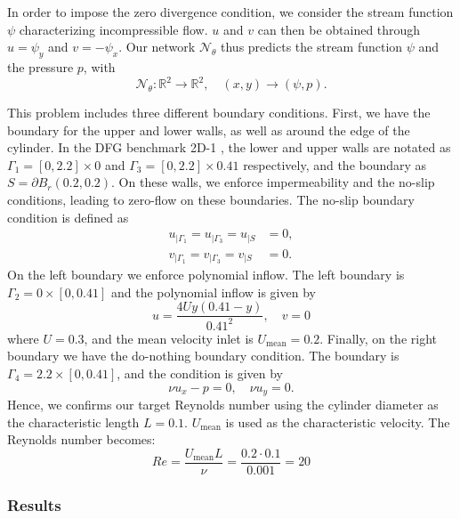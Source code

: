 In order to impose the zero divergence condition, we consider the stream function $\psi$ characterizing incompressible flow. $u$ and $v$ can then be obtained through $u=\psi_y$ and $v=-\psi_x$. Our network $\mathcal{N}_\theta$ thus predicts the stream function $\psi$ and the pressure $p$, with
\begin{equation}
    \mathcal{N}_\theta : \mathbb{R}^2 \to \mathbb{R}^2, \quad (x,y)\to (\psi, p).
\end{equation}


This problem includes three different boundary conditions.
First, we have the boundary for the upper and lower walls, as well as around the edge of the cylinder.
In the DFG benchmark 2D-1 \cite{DFG}, the lower and upper walls are notated as $\Gamma_1 = [0,2.2]\times 0$ and $\Gamma_3 = [0,2.2]\times 0.41$ respectively, and the boundary as $S=\partial B_r(0.2,0.2)$.
On these walls, we enforce impermeability and the no-slip conditions, leading to zero-flow on these boundaries. 
The no-slip boundary condition is defined as
\begin{align*}
    u_{|\Gamma_1} = u_{|\Gamma_3} = u_{|S} &= 0, \\
    v_{|\Gamma_1} = v_{|\Gamma_3} = v_{|S} &= 0.
\end{align*}
On the left boundary we enforce polynomial inflow.
The left boundary is $\Gamma_2 = 0\times [0,0.41]$ and the polynomial inflow is given by
\begin{equation*}
    u=\frac{4Uy(0.41-y)}{0.41^2}, \quad v=0
\end{equation*}
where $U=0.3$, and the mean velocity inlet is $U_{\text{mean}} = 0.2$.
Finally, on the right boundary we have the do-nothing boundary condition.
The boundary is $\Gamma_4=2.2\times[0,0.41]$, and the condition is given by
\begin{equation*}
    \nu u_x - p = 0, \quad \nu u_y = 0.
\end{equation*}
Hence, we confirms our target Reynolds number using the cylinder diameter as the characteristic length $L=0.1$. $U_{\text{mean}}$ is used as the characteristic velocity. The Reynolds number becomes:
\begin{equation*}
    Re = \frac {U_{\text{mean}} L} \nu = \frac {0.2 \cdot 0.1} {0.001} = 20 
\end{equation*}

\subsubsection{Results}

